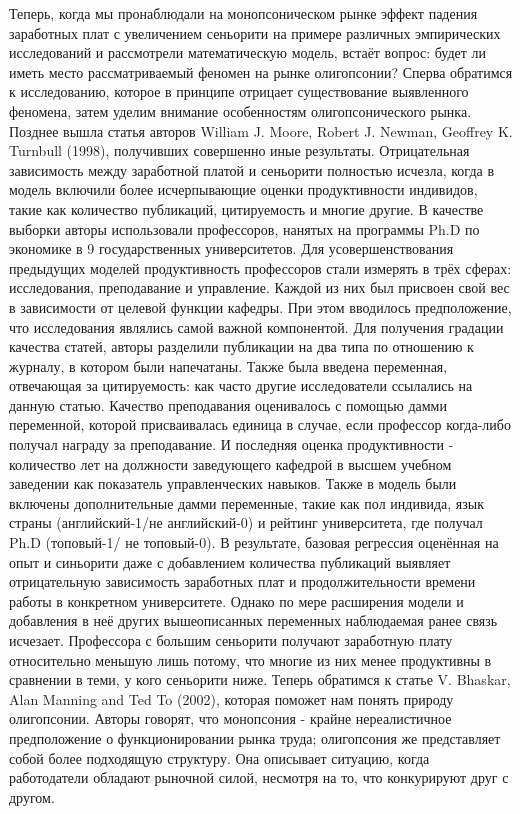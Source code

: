 \documentclass[a4paper, 12pt]{article}
\theoremstyle{definition}
\theoremstyle{plain}
\begin{document}
	Теперь, когда мы пронаблюдали на монопсоническом рынке эффект падения заработных плат с увеличением сеньорити на примере различных эмпирических исследований и рассмотрели математическую модель, встаёт вопрос: будет ли иметь место рассматриваемый феномен на рынке олигопсонии? Сперва обратимся к исследованию, которое в принципе отрицает существование выявленного феномена, затем уделим внимание особенностям олигопсонического рынка.
	Позднее вышла статья авторов William J. Moore, Robert J. Newman, Geoffrey K. Turnbull (1998), получивших совершенно иные результаты. Отрицательная зависимость  между заработной платой и сеньорити полностью исчезла, когда в модель включили более исчерпывающие оценки продуктивности индивидов, такие как количество публикаций, цитируемость и многие другие. В качестве выборки авторы использовали профессоров, нанятых на программы Ph.D по экономике в 9 государственных университетов. Для усовершенствования предыдущих моделей продуктивность профессоров стали измерять в трёх сферах: исследования, преподавание и управление. Каждой из них был присвоен свой вес в зависимости от целевой функции кафедры. При этом вводилось предположение, что  исследования являлись самой важной компонентой. Для получения градации качества статей, авторы разделили публикации на два типа по отношению к журналу, в котором были напечатаны. Также была введена переменная, отвечающая за цитируемость: как часто другие исследователи ссылались на данную статью. Качество преподавания оценивалось с помощью дамми переменной, которой присваивалась единица в случае, если профессор когда-либо получал награду за преподавание. И последняя оценка продуктивности - количество лет на должности заведующего кафедрой в высшем учебном заведении как показатель управленческих навыков. Также в модель были включены дополнительные дамми переменные, такие как пол индивида, язык страны (английский-1/не английский-0) и рейтинг университета, где получал Ph.D (топовый-1/ не топовый-0). 
	В результате, базовая регрессия оценённая на опыт и синьорити даже с добавлением количества публикаций выявляет отрицательную зависимость заработных плат и продолжительности времени работы в конкретном университете. Однако по мере расширения модели и добавления в неё других вышеописанных переменных наблюдаемая ранее связь исчезает. Профессора с большим сеньорити получают заработную плату относительно меньшую лишь потому, что многие из них менее продуктивны в сравнении в теми, у кого сеньорити ниже.
	Теперь обратимся к статье V. Bhaskar, Alan Manning and Ted To (2002), которая поможет нам понять природу олигопсонии. Авторы говорят,  что монопсония - крайне нереалистичное предположение о функционировании рынка труда; олигопсония же представляет собой более подходящую структуру. Она описывает ситуацию, когда работодатели обладают рыночной силой, несмотря на то, что конкурируют друг с другом. 
\end{document}
